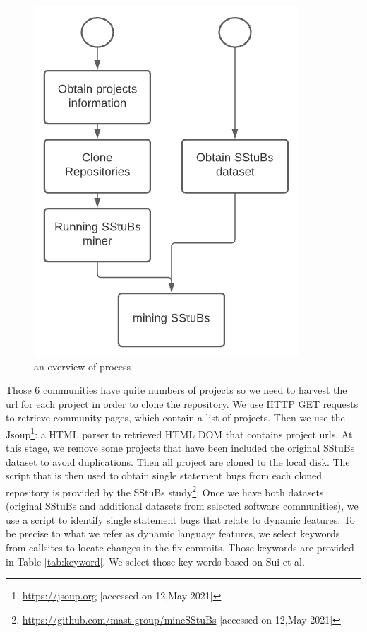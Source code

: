 \documentclass[sigconf,review,anonymous]{acmart}
\begin{document}
\begin{figure}[H]
  \centering
      \includegraphics[width=0.7\columnwidth]{figures/process.png}
  \caption{an overview of process}
  \label{fig:process}
\end{figure}


Those 6 communities have quite numbers of projects so we need to harvest the url for each project in order to clone the repository. We use HTTP GET requests to retrieve community pages, which contain a list of projects. Then we use the Jsoup\footnote{\url{https://jsoup.org} [accessed on 12,May 2021]}: a HTML parser to retrieved HTML DOM that contains project urls. At this stage, we remove some projects that have been included the original SStuBs dataset to avoid duplications. Then all project are cloned to the local disk.  
The script that is then used to obtain single statement bugs from each cloned repository is provided by the SStuBs study\footnote{\url{https://github.com/mast-group/mineSStuBs} [accessed on 12,May 2021]}.  Once we have both datasets (original SStuBs and additional datasets from selected software communities), we use a script to identify single statement bugs that relate to dynamic features. To be precise to what we refer as dynamic language features, we select keywords from callsites to locate changes in the fix commits.  Those keywords are provided in Table \ref{tab:keyword}. We select those key words based on Sui et al.\cite{sui2018soundness}
\end{document}
